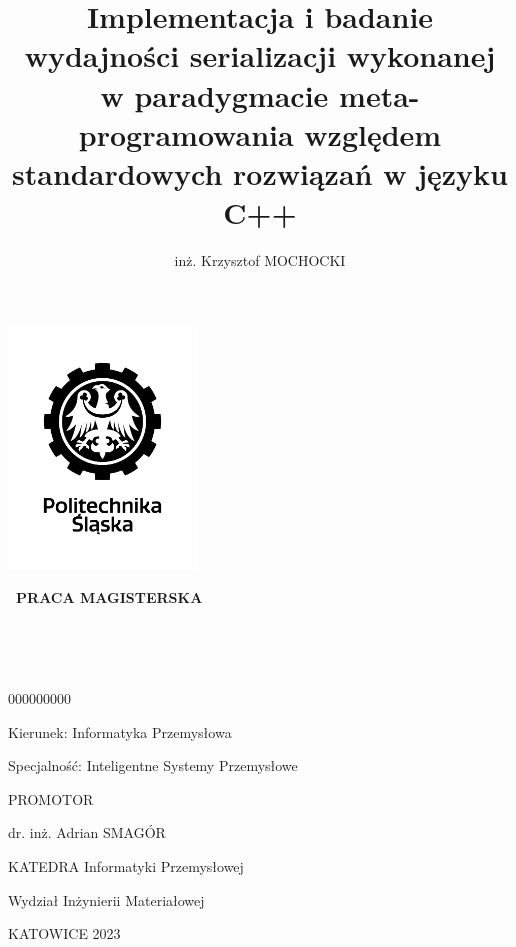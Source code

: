 \documentclass[12pt]{article}
\title{Implementacja i badanie wydajności serializacji wykonanej w paradygmacie meta-programowania względem standardowych rozwiązań w języku C++}
\author{inż. Krzysztof MOCHOCKI}
\date{}
\begin{document}
	\renewcommand*\listfigurename{}
	\renewcommand*\listoftables{}

	\begin{titlepage}
		\clearpage
		\centering

		\includegraphics[width=5cm, keepaspectratio=true]{./img/black_and_white_polsl_logo.png}

		{\LARGE\bfseries\ PRACA MAGISTERSKA}

		\vspace*{1cm}

		{\LARGE \MyTitle}

		\Large\bfseries\

		\begin{spacing}{1.125}
			\MyAuthor\

			000000000
			\vspace*{1cm}

			Kierunek: Informatyka Przemysłowa

			Specjalność: Inteligentne Systemy Przemysłowe

			\vspace*{1cm}

			PROMOTOR

			dr. inż. Adrian SMAGÓR

			\vspace*{0.5cm}

			KATEDRA Informatyki Przemysłowej

			Wydział Inżynierii Materiałowej

			\vspace*{\vfill}

			KATOWICE 2023
		\end{spacing}

		\thispagestyle{empty}
	\end{titlepage}
\end{document}
